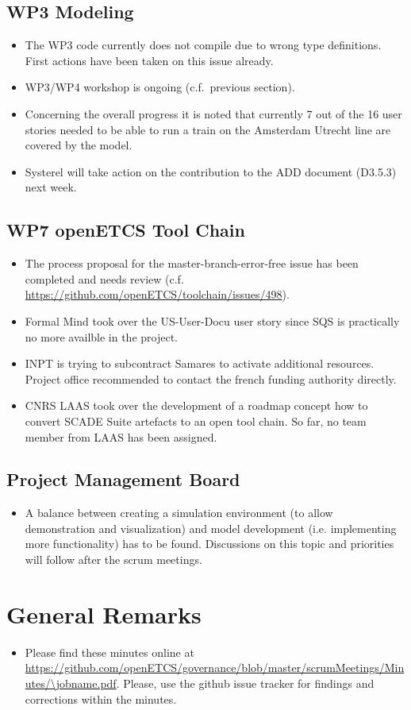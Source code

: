 \documentclass[a4paper, 11pt]{article}
\begin{document}
\subsection{WP3 Modeling}
\begin{itemize}
\item The WP3 code currently does not compile due to wrong type definitions. First actions have been taken on this issue already.
\item WP3/WP4 workshop is ongoing (c.f.~previous section).
\item Concerning the overall progress it is noted that currently 7 out of the 16 user stories needed to be able to run a train on the Amsterdam Utrecht line are covered by the model.
\item Systerel will take action on the contribution to the ADD document (D3.5.3) next week.
\end{itemize}

\subsection{WP7 openETCS Tool Chain}

\begin{itemize}
\item The process proposal for the master-branch-error-free issue has been completed and needs review (c.f. \url{https://github.com/openETCS/toolchain/issues/498}).
\item Formal Mind took over the US-User-Docu user story since SQS is practically no more availble in the project.
\item INPT is trying to subcontract Samares to activate additional resources. Project office recommended to contact the french funding authority directly.
\item CNRS LAAS took over the development of a roadmap concept how to convert SCADE Suite artefacts to an open tool chain. So far, no team member from LAAS has been assigned.
\end{itemize}

\subsection{Project Management Board}
\begin{itemize}
\item A balance between creating a simulation environment (to allow demonstration and visualization) and model development (i.e. implementing more functionality) has to be found. Discussions on this topic and priorities will follow after the scrum meetings.
\end{itemize}


\section{General Remarks}

\begin{itemize}
\item Please find these minutes online at \url{https://github.com/openETCS/governance/blob/master/scrumMeetings/Minutes/\jobname.pdf}. Please, use the github issue tracker for findings and corrections within the minutes.
\end{itemize}
\end{document}
